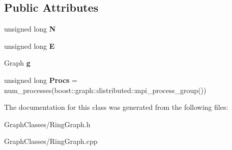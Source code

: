 \subsection*{Public Attributes}
\begin{DoxyCompactItemize}
\item 
\mbox{\label{classRingGraphObject_a2e39cfc91f3ddaa28d3cdaa74d5bf8f1}} 
unsigned long {\bfseries N}
\item 
\mbox{\label{classRingGraphObject_a52c61f4334217dbefb02e52cc17ce46e}} 
unsigned long {\bfseries E}
\item 
\mbox{\label{classRingGraphObject_a19a79f5fad45c47faa04b7d06e00a517}} 
Graph {\bfseries g}
\item 
\mbox{\label{classRingGraphObject_a7848c893b994393df819857229721b47}} 
unsigned long {\bfseries Procs} = num\+\_\+processes(boost\+::graph\+::distributed\+::mpi\+\_\+process\+\_\+group())
\end{DoxyCompactItemize}


The documentation for this class was generated from the following files\+:\begin{DoxyCompactItemize}
\item 
Graph\+Classes/Ring\+Graph.\+h\item 
Graph\+Classes/Ring\+Graph.\+cpp\end{DoxyCompactItemize}
